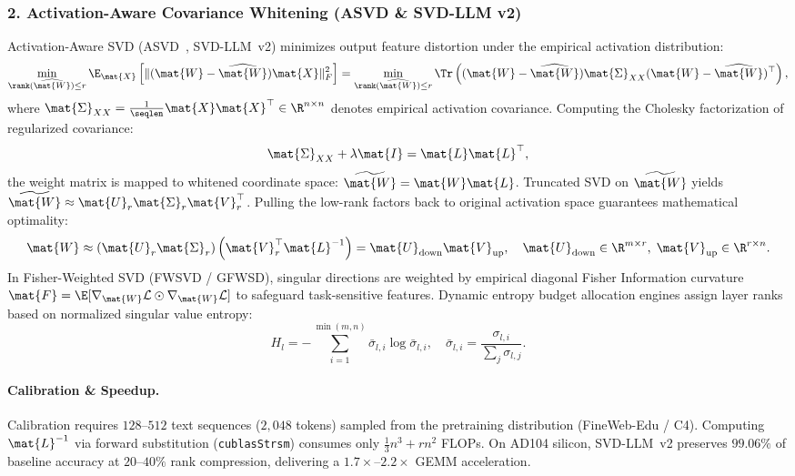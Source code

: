 \subsubsection{2. Activation-Aware Covariance Whitening (ASVD \& SVD-LLM v2)}
\label{subsubsec:activation_whitening}
Activation-Aware SVD (ASVD~\cite{yuan2023asvd}, SVD-LLM~v2) minimizes output feature distortion under the empirical activation distribution:
\begin{equation}
\min_{\rank(\widehat{\mat{W}}) \le r} \E_{\mat{X}}\left[ \|(\mat{W} - \widehat{\mat{W}})\mat{X}\|_F^2 \right] = \min_{\rank(\widehat{\mat{W}}) \le r} \Tr\left( (\mat{W} - \widehat{\mat{W}}) \mat{\Sigma}_{XX} (\mat{W} - \widehat{\mat{W}})^\top \right),
\label{eq:asvd_whitening_loss}
\end{equation}
where $\mat{\Sigma}_{XX} = \frac{1}{\seqlen} \mat{X}\mat{X}^\top \in \R^{n \times n}$ denotes empirical activation covariance. Computing the Cholesky factorization of regularized covariance:
\begin{equation}
\mat{\Sigma}_{XX} + \lambda \mat{I} = \mat{L} \mat{L}^\top,
\label{eq:covariance_cholesky}
\end{equation}
the weight matrix is mapped to whitened coordinate space: $\widetilde{\mat{W}} = \mat{W} \mat{L}$. Truncated SVD on $\widetilde{\mat{W}}$ yields $\widetilde{\mat{W}} \approx \mat{U}_r \mat{\Sigma}_r \mat{V}_r^\top$. Pulling the low-rank factors back to original activation space guarantees mathematical optimality:
\begin{equation}
\mat{W} \approx \left( \mat{U}_r \mat{\Sigma}_r \right) \left( \mat{V}_r^\top \mat{L}^{-1} \right) = \mat{U}_{\text{down}} \mat{V}_{\text{up}}, \quad \mat{U}_{\text{down}} \in \R^{m \times r}, \; \mat{V}_{\text{up}} \in \R^{r \times n}.
\label{eq:cholesky_pullback_factors}
\end{equation}
In Fisher-Weighted SVD (FWSVD / GFWSD), singular directions are weighted by empirical diagonal Fisher Information curvature $\mat{F} = \E[\nabla_{\mat{W}} \mathcal{L} \odot \nabla_{\mat{W}} \mathcal{L}]$ to safeguard task-sensitive features. Dynamic entropy budget allocation engines assign layer ranks based on normalized singular value entropy:
\begin{equation}
H_l = -\sum_{i=1}^{\min(m, n)} \bar{\sigma}_{l, i} \log \bar{\sigma}_{l, i}, \quad \bar{\sigma}_{l, i} = \frac{\sigma_{l, i}}{\sum_j \sigma_{l, j}}.
\end{equation}

\paragraph{Calibration \& Speedup.} Calibration requires $128\text{--}512$ text sequences ($2{,}048$ tokens) sampled from the pretraining distribution (FineWeb-Edu / C4). Computing $\mat{L}^{-1}$ via forward substitution (\texttt{cublasStrsm}) consumes only $\frac{1}{3} n^3 + r n^2$ FLOPs. On AD104 silicon, SVD-LLM~v2 preserves $99.06\%$ of baseline accuracy at $20\text{--}40\%$ rank compression, delivering a $1.7\times\text{--}2.2\times$ GEMM acceleration.

